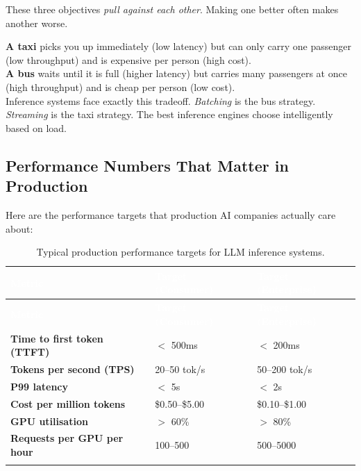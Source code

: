 \documentclass[12pt, twoside, openright]{book}
\begin{document}
These three objectives \textit{pull against each other}.
Making one better often makes another worse.

\begin{analogybox}
\textbf{A taxi} picks you up immediately (low latency) but can only
carry one passenger (low throughput) and is expensive per person
(high cost).\\[4pt]
\textbf{A bus} waits until it is full (higher latency) but carries
many passengers at once (high throughput) and is cheap per person
(low cost).\\[4pt]
Inference systems face exactly this tradeoff.
\textit{Batching} is the bus strategy.
\textit{Streaming} is the taxi strategy.
The best inference engines choose intelligently based on load.
\end{analogybox}

\subsection{Performance Numbers That Matter in Production}

Here are the performance targets that production AI companies actually
care about:

\vspace{6pt}
\begin{longtable}{>{\bfseries}p{4cm} p{4cm} p{4cm}}
\rowcolor{tableheadbg}
\textcolor{white}{\textbf{Metric}} &
\textcolor{white}{\textbf{Target (Consumer)}} &
\textcolor{white}{\textbf{Target (Enterprise)}} \\
\toprule
\endfirsthead
\rowcolor{tableheadbg}
\textcolor{white}{\textbf{Metric}} &
\textcolor{white}{\textbf{Target (Consumer)}} &
\textcolor{white}{\textbf{Target (Enterprise)}} \\
\toprule
\endhead
Time to first token (TTFT) & $<$ 500ms & $<$ 200ms \\
Tokens per second (TPS) & 20--50 tok/s & 50--200 tok/s \\
P99 latency & $<$ 5s & $<$ 2s \\
Cost per million tokens & \$0.50--\$5.00 & \$0.10--\$1.00 \\
GPU utilisation & $>$ 60\% & $>$ 80\% \\
Requests per GPU per hour & 100--500 & 500--5000 \\
\bottomrule
\caption{Typical production performance targets for LLM inference systems.}
\label{tab:perf-targets}
\end{longtable}
\end{document}
